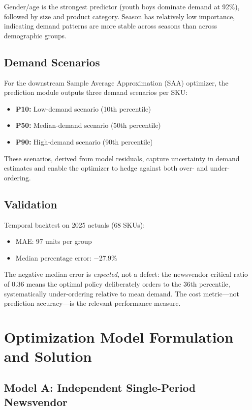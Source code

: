 \documentclass[11pt, letterpaper]{article}
\begin{document}
Gender/age is the strongest predictor (youth boys dominate demand at 92\%), followed by size and product category. Season has relatively low importance, indicating demand patterns are more stable across seasons than across demographic groups.

\subsection{Demand Scenarios}

For the downstream Sample Average Approximation (SAA) optimizer, the prediction module outputs three demand scenarios per SKU:
\begin{itemize}[nosep]
    \item \textbf{P10:} Low-demand scenario (10th percentile)
    \item \textbf{P50:} Median-demand scenario (50th percentile)
    \item \textbf{P90:} High-demand scenario (90th percentile)
\end{itemize}
These scenarios, derived from model residuals, capture uncertainty in demand estimates and enable the optimizer to hedge against both over- and under-ordering.

\subsection{Validation}

Temporal backtest on 2025 actuals (68 SKUs):
\begin{itemize}[nosep]
    \item MAE: 97 units per group
    \item Median percentage error: $-$27.9\%
\end{itemize}
The negative median error is \emph{expected}, not a defect: the newsvendor critical ratio of 0.36 means the optimal policy deliberately orders to the 36th percentile, systematically under-ordering relative to mean demand. The cost metric---not prediction accuracy---is the relevant performance measure.

\section{Optimization Model Formulation and Solution}

\subsection{Model A: Independent Single-Period Newsvendor}
\end{document}
